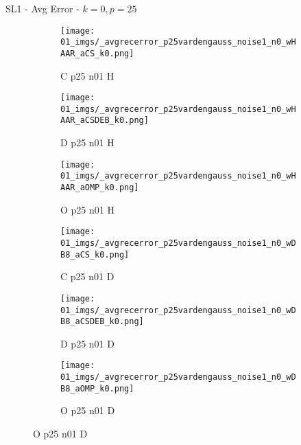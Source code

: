 \begin{frame}{SL1 - Avg Error - $k=0,p=25$}{}
\begin{figure}
\begin{subfigure}{0.13\textwidth}
\texttt{[image: 01\_imgs/\_avgrecerror\_p25vardengauss\_noise1\_n0\_wHAAR\_aCS\_k0.png]}
\caption*{\tiny C p25 n01 H}
\end{subfigure}
\begin{subfigure}{0.13\textwidth}
\texttt{[image: 01\_imgs/\_avgrecerror\_p25vardengauss\_noise1\_n0\_wHAAR\_aCSDEB\_k0.png]}
\caption*{\tiny D p25 n01 H}
\end{subfigure}
\begin{subfigure}{0.13\textwidth}
\texttt{[image: 01\_imgs/\_avgrecerror\_p25vardengauss\_noise1\_n0\_wHAAR\_aOMP\_k0.png]}
\caption*{\tiny O p25 n01 H}
\end{subfigure}
\begin{subfigure}{0.13\textwidth}
\texttt{[image: 01\_imgs/\_avgrecerror\_p25vardengauss\_noise1\_n0\_wDB8\_aCS\_k0.png]}
\caption*{\tiny C p25 n01 D}
\end{subfigure}
\begin{subfigure}{0.13\textwidth}
\texttt{[image: 01\_imgs/\_avgrecerror\_p25vardengauss\_noise1\_n0\_wDB8\_aCSDEB\_k0.png]}
\caption*{\tiny D p25 n01 D}
\end{subfigure}
\begin{subfigure}{0.13\textwidth}
\texttt{[image: 01\_imgs/\_avgrecerror\_p25vardengauss\_noise1\_n0\_wDB8\_aOMP\_k0.png]}
\caption*{\tiny O p25 n01 D}
\end{subfigure}

\vspace{5pt}


\end{figure}
\end{frame}
